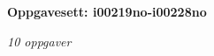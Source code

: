 \centerline{\bf Oppgavesett: i00219no-i00228no}
\vskip 10pt
\centerline{\it 10 oppgaver}\vskip 10pt
\vskip 10pt
